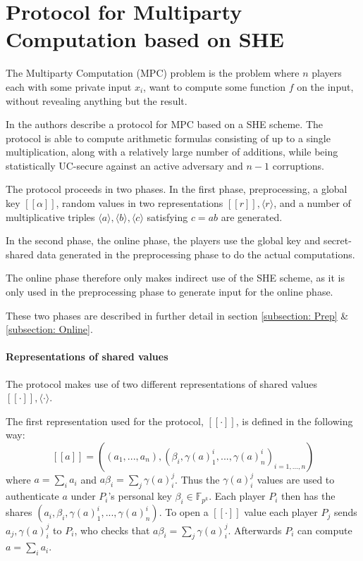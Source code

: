 \documentclass[../main.tex]{subfiles}
\begin{document}
\section{Protocol for Multiparty Computation based on SHE} \label{section: MPC scheme}

The Multiparty Computation (MPC) problem is the problem where $n$ players each with some private input $x_i$, want to compute some function $f$ on the input, without revealing anything but the result.

In \cite{damgaard2012multiparty} the authors describe a protocol for MPC based on a SHE scheme. The protocol is able to compute arithmetic formulas consisting of up to a single multiplication, along with a relatively large number of additions, while being statistically UC-secure against an active adversary and $n - 1$ corruptions.

The protocol proceeds in two phases. In the first phase, preprocessing, a global key $[\![\alpha]\!]$, random values in two representations $[\![r]\!], \langle r \rangle$, and a number of multiplicative triples $\langle a \rangle, \langle b \rangle, \langle c \rangle$ satisfying $c = ab$ are generated.

In the second phase, the online phase, the players use the global key and secret-shared data generated in the preprocessing phase to do the actual computations.

The online phase therefore only makes indirect use of the SHE scheme, as it is only used in the preprocessing phase to generate input for the online phase.

These two phases are described in further detail in section \ref{subsection: Prep} \& \ref{subsection: Online}.

\paragraph{Representations of shared values}
The protocol makes use of two different representations of shared values $[\![ \cdot ]\!], \langle \cdot \rangle$.

The first representation used for the protocol, $[\![ \cdot ]\!]$, is defined in the following way:
$$[\![ a ]\!] = ((a_1, ..., a_n), (\beta_i, \gamma(a)^i_1, ..., \gamma(a)^i_n)_{i = 1, ..., n})$$
where $a = \sum_i a_i$ and $a\beta_i = \sum_j \gamma(a)^j_i$. Thus the $\gamma(a)^j_i$ values are used to authenticate $a$ under $P_i$'s personal key $\beta_i \in \mathbb{F}_{p^k}$. Each player $P_i$ then has the shares $(a_i, \beta_i, \gamma(a)^i_1, ..., \gamma(a)^i_n)$. To open a $[\![ \cdot ]\!]$ value each player $P_j$ sends $a_j, \gamma(a)^j_i$ to $P_i$, who checks that $a\beta_i = \sum_j \gamma(a)^j_i$. Afterwards $P_i$ can compute $a = \sum_i a_i$.
\end{document}
